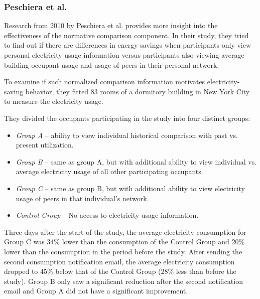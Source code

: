 \documentclass[journal]{vgtc}                %
\begin{document}
\subsubsection{Peschiera et al.}
Research from 2010 by Peschiera et al. \cite{peschiera2010response} provides more insight into the effectiveness of the normative comparison component. In their study, they tried to find out if there are differences in energy savings when participants only view personal electricity usage information versus participants also viewing average building occupant usage and usage of peers in their personal network.

To examine if such normalized comparison information motivates electricity-saving behavior, they fitted 83 rooms of a dormitory building in New York City to measure the electricity usage.

They divided the occupants participating in the study into four distinct groups:
\begin{itemize}
\item \textit{Group A} -- ability to view individual historical comparison with past vs. present utilization.
\item \textit{Group B} -- same as group A, but with additional ability to view individual vs. average electricity usage of all other participating occupants.
\item \textit{Group C} -- same as group B, but with additional ability to view electricity usage of peers in that individual's network.
\item \textit{Control Group} -- No access to electricity usage information.
\end{itemize}


Three days after the start of the study, the average electricity consumption for Group C was 34\% lower than the consumption of the Control Group and 20\% lower than the consumption in the period before the study.
After sending the second consumption notification email, the average electricity consumption dropped to 45\% below that of the Control Group (28\% less than before the study).
Group B only saw a significant reduction after the second notification email and Group A did not have a significant improvement.
\end{document}
